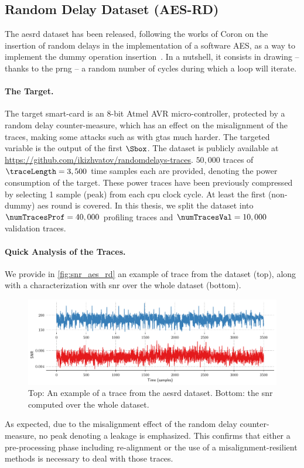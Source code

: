 \subsection{Random Delay Dataset (AES-RD)}
\label{sec:aesrd}
The \gls{aesrd} dataset has been released, following the works of Coron \etal{} on the insertion of random delays in the implementation of a software AES, as a way to implement the dummy operation insertion~\cite{coron_random_2009,coron_random_2010}.
In a nutshell, it consists in drawing -- thanks to the \gls{prng} -- a random number of cycles during which a loop will iterate.

\paragraph{The Target.}
The target smart-card is an 8-bit \textsf{Atmel AVR} micro-controller, protected by a random delay counter-measure, which has an effect on the misalignment of the traces, making some attacks such as with \glspl{gta} much harder.
The targeted variable is the output of the first \(\Sbox\).
The dataset is publicly available at \url{https://github.com/ikizhvatov/randomdelays-traces}.
\(50,000\) traces of \(\traceLength = 3,500\) time samples each are provided, denoting the power consumption of the target.
These power traces have been previously compressed by selecting 1 sample (peak) from each \gls{cpu} clock cycle.
At least the first (non-dummy) \gls{aes} round is covered.
In this thesis, we split the dataset into \(\numTracesProf = 40,000\) profiling traces and \(\numTracesVal = 10,000\) validation traces.

\paragraph{Quick Analysis of the Traces.}
We provide in \autoref{fig:snr_aes_rd} an example of trace from the dataset (top), along with a characterization with \gls{snr} over the whole dataset (bottom).
\begin{figure}
    \centering
    \includegraphics[width=\textwidth]{AES-RD/snr}
    \caption{Top: An example of a trace from the \gls{aesrd} dataset.
    Bottom: the \gls{snr} computed over the whole dataset.}
    \label{fig:snr_aes_rd}
\end{figure}
As expected, due to the misalignment effect of the random delay counter-measure, no peak denoting a leakage is emphasized.
This confirms that either a pre-processing phase including re-alignment or the use of a misalignment-resilient methods is necessary to deal with those traces.

